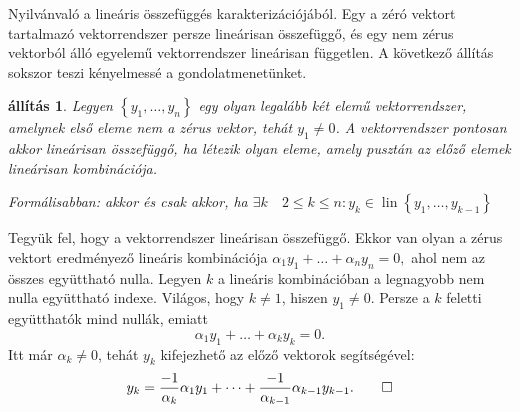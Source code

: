 \documentclass[9pt, a4paper, showtrims]{memoir}
\makeatletter
\renewenvironment{proof}[1][\proofname]
    {\par\pushQED{\qed}%
    \normalfont \topsep6\p@\@plus6\p@\relax
    \trivlist
    \item[\hskip\labelsep
        \itshape
    #1\@addpunct{:}]\ignorespaces}
    {\popQED\endtrivlist\@endpefalse}
\theoremstyle{plain}
\newtheorem{proposition}{állítás}[chapter]
\theoremstyle{remark}
\theoremstyle{definition}
\DeclareMathOperator{\lin}{lin}
\makeatother
\begin{document}
\begin{proof}
	Nyilvánvaló a lineáris összefüggés karakterizációjából.
\end{proof}
Egy a zéró vektort tartalmazó vektorrendszer persze lineárisan összefüggő,
és egy nem zérus vektorból álló egyelemű vektorrendszer lineárisan független.
A következő állítás sokszor teszi kényelmessé a gondolatmenetünket.
\begin{proposition}
	Legyen $\left\{ y_1,\ldots,y_n \right\}$ egy olyan legalább két elemű vektorrendszer,
	amelynek első eleme nem a zérus vektor, tehát $y_1\neq 0$.
	A vektorrendszer pontosan akkor lineárisan összefüggő,
	ha létezik olyan eleme,
	amely pusztán az előző elemek lineárisan kombinációja.

	Formálisabban: akkor és csak akkor,
	ha
	$\exists k\quad 2\leq k\leq n : y_k\in\lin\left\{ y_1,\ldots,y_{k-1} \right\}$
\end{proposition}
\begin{proof}
	Tegyük fel, hogy a vektorrendszer lineárisan összefüggő.
	Ekkor van olyan a zérus vektort eredményező lineáris kombinációja
	\(
	\alpha_1y_1+\dots+\alpha_ny_n=0,
	\)
	ahol nem az összes együttható nulla.
	Legyen $k$ a lineáris kombinációban a legnagyobb nem nulla együttható indexe.
	Világos, hogy $k\neq 1$,
	hiszen $y_1\neq 0$.
	Persze a $k$ feletti együtthatók mind nullák,
	emiatt
	\[
		\alpha_1y_1+\dots+\alpha_ky_k=0.
	\]
	Itt már $\alpha_k\neq 0$, tehát $y_k$ kifejezhető az előző vektorok segítségével:
	\[
		y_k=
		\frac{-1}{\alpha_k}\alpha_1y_1+\dots+\frac{-1}{\alpha_{k-1}}\alpha_{k-1}y_{k-1}.\qedhere
	\]
\end{proof}
\end{document}
